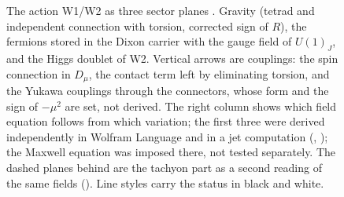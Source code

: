 \begin{figure}[t]
\caption{The action W1/W2 as three sector planes \Conditional. Gravity (tetrad and independent connection with torsion,
corrected sign of $R$), the fermions stored in the Dixon carrier with the gauge field of $U(1)_J$, and the Higgs doublet of
W2. Vertical arrows are couplings: the spin connection in $D_\mu$, the contact term left by eliminating torsion, and the
Yukawa couplings through the connectors, whose form and the sign of $-\mu^2$ are set, not derived. The right column shows
which field equation follows from which variation; the first three were derived independently in Wolfram Language and
in a jet computation (, ); the Maxwell equation was imposed there, not tested separately. The dashed planes behind are the tachyon part as a second reading of the
same fields (). Line styles carry the status in black and white.}
\label{fig:act-scheme}
\end{figure}
